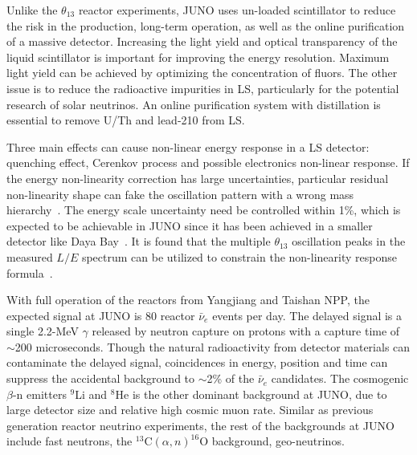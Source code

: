 
Unlike the $\theta_{13}$ reactor experiments, JUNO uses un-loaded scintillator to reduce the risk in the production, long-term operation, as well as the online purification of a massive detector. Increasing the light yield and optical transparency of the liquid scintillator is important for improving the energy resolution. Maximum light yield can be achieved by optimizing the concentration of fluors. The other issue is to reduce the radioactive impurities in LS, particularly for the potential research of solar neutrinos. An online purification system with distillation is essential to remove U/Th and lead-210 from LS.

Three main effects can cause non-linear energy response in a LS detector: quenching effect, Cerenkov process and possible electronics non-linear response. If the energy non-linearity correction has large uncertainties, particular residual non-linearity shape can fake the oscillation pattern with a wrong mass hierarchy~\cite{Qian-PRD13}. The energy scale uncertainty need be controlled within 1\%, which is expected to be achievable in JUNO since it has been achieved in a smaller detector like Daya Bay~\cite{Zhang-Neutrino14}. It is found that the multiple $\theta_{13}$ oscillation peaks in the measured $L/E$ spectrum can be utilized to constrain the non-linearity response formula~\cite{Li-PRD13}.

With full operation of the reactors from Yangjiang and Taishan NPP, the expected signal at JUNO is 80 reactor $\bar\nu_e$ events per day. The delayed signal is a single 2.2-MeV $\gamma$ released by neutron capture on protons with a capture time of $\sim$200 microseconds. Though the natural radioactivity from detector materials can contaminate the delayed signal, coincidences in energy, position and time can suppress the accidental background to $\sim$2\% of the $\bar\nu_e$ candidates. The cosmogenic $\beta$-n emitters $^9$Li and $^8$He is the other dominant background at JUNO, due to large detector size and relative high cosmic muon rate. Similar as previous generation reactor neutrino experiments, the rest of the backgrounds at JUNO include fast neutrons, the $^{13}$C$(\alpha, n)^{16}$O background, geo-neutrinos.

